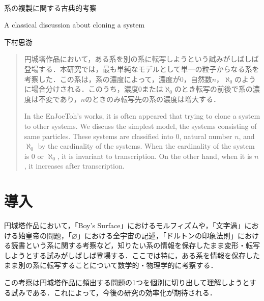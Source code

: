 \documentclass[10pt, a5paper, twoside]{jsarticle}
\theoremstyle{definition}
\begin{document}
	~ %

	\begin{center}

		\Large{系の複製に関する古典的考察}

		\vspace{3mm}

		\large{A classical discussion about cloning a system}

		\vspace{3mm}
		
		\large{下村思游}

	\end{center}

	\vspace{3mm}

	\begin{abstract}

		円城塔作品において，ある系を別の系に転写しようという試みがしばしば登場する．本研究では，最も単純なモデルとして単一の粒子からなる系を考察した．この系は，系の濃度によって，濃度が0，自然数$n$，$\aleph_0$のように場合分けされる．このうち，濃度0または$\aleph_0$のとき転写の前後で系の濃度は不変であり，$n$のときのみ転写先の系の濃度は増大する．


		\vspace{3mm}

		In the EnJoeToh's works, it is often appeared that trying to clone a system to other systems. We discuss the simplest model, the systems consisting of same particles. These systems are classified into 0, natural number $n$, and $\aleph_0$ by the cardinality of the systems. When the cardinality of the system is 0 or $\aleph_0$, it is invariant to transcription. On the other hand, when it is $n$, it increases after transcription.

	\end{abstract}

	\section{導入}

		円城塔作品において，「Boy's Surface」におけるモルフィズムや，「文字渦」における始皇帝の問題，「$\varnothing$」における全宇宙の記述，「ドルトンの印象法則」における読書という系に関する考察など，知りたい系の情報を保存したまま変形・転写しようとする試みがしばしば登場する．ここでは特に，ある系を情報を保存したまま別の系に転写することについて数学的・物理学的に考察する．

		この考察は円城塔作品に頻出する問題の1つを個別に切り出して理解しようとする試みである．これによって，今後の研究の効率化が期待される．
\end{document}
